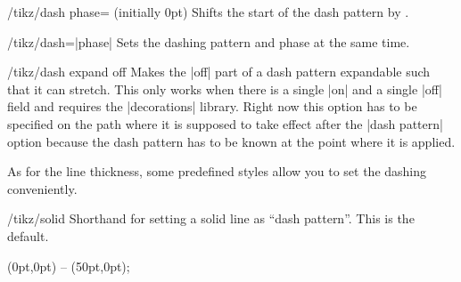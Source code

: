 \begin{key}{/tikz/dash phase= (initially 0pt)}
    Shifts the start of the dash pattern by .
\begin{codeexample}[]
\begin{tikzpicture}[dash pattern=on 20pt off 10pt]
  \draw[dash phase=0pt] (0pt,3pt) -- (3.5cm,3pt);
  \draw[dash phase=10pt] (0pt,0pt) -- (3.5cm,0pt);
\end{tikzpicture}
\end{codeexample}
\end{key}

\begin{key}{/tikz/dash=|phase|}
    Sets the dashing pattern and phase at the same time.
\begin{codeexample}[]
\begin{tikzpicture}
  \draw [dash=on 20pt off 10pt phase  0pt] (0pt,3pt) -- (3.5cm,3pt);
  \draw [dash=on 20pt off 10pt phase 10pt] (0pt,0pt) -- (3.5cm,0pt);
\end{tikzpicture}
\end{codeexample}
\end{key}

\begin{key}{/tikz/dash expand off}
    Makes the |off| part of a dash pattern expandable such that it can stretch.
    This only works when there is a single |on| and a single |off| field and
    requires the |decorations| library. Right now this option has to be
    specified on the path where it is supposed to take effect after the
    |dash pattern| option because the dash pattern has to be known at the point
    where it is applied.
\begin{codeexample}[preamble={\usetikzlibrary{decorations}}]
\end{codeexample}
\end{key}

As for the line thickness, some predefined styles allow you to set the dashing
conveniently.

\begin{stylekey}{/tikz/solid}
    Shorthand for setting a solid line as ``dash pattern''. This is the default.
\begin{codeexample}[]
\tikz \draw[solid] (0pt,0pt) -- (50pt,0pt);
\end{codeexample}
\end{stylekey}

